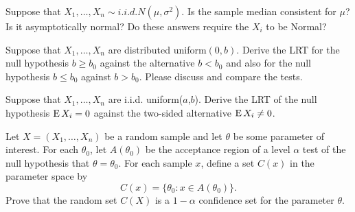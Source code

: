 \begin{hw}
  Suppose that $X_1,\dots,X_n \sim i.i.d. N(\mu, \sigma^2)$. Is
  the sample median consistent for $\mu$? Is it asymptotically
  normal? Do these answers require the $X_i$ to be Normal?
\end{hw}

\begin{hw}
  Suppose that $X_1,\dots,X_n$ are distributed uniform$(0,b)$.
  Derive the LRT for the null hypothesis $b \geq b_0$ against the
  alternative $b < b_0$ and also for the null hypothesis $b \leq b_0$
  against $b > b_0$. Please discuss and compare the tests.
\end{hw}

\begin{hw}
  Suppose that $X_1,\dots,X_n$ are i.i.d. uniform($a$,$b$).
  Derive the LRT of the null hypothesis $\operatorname{E} X_i = 0$ against the
  two-sided alternative $\operatorname{E} X_i \neq 0$.
\end{hw}

\begin{hw}
  Let $X = (X_1,\dots,X_n)$ be a random sample and let $\theta$ be
  some parameter of interest. For each $\theta_0$, let $A(\theta_0)$
  be the acceptance region of a level $\alpha$ test of the null
  hypothesis that $\theta = \theta_0$. For each sample $x$, define a
  set $C(x)$ in the parameter space by
  \begin{equation}
     C(x) = \{ \theta_0 : x \in A(\theta_0) \}.
  \end{equation}
  Prove that the random set $C(X)$ is a $1-\alpha$ confidence set for the
  parameter $\theta$.
\end{hw}

